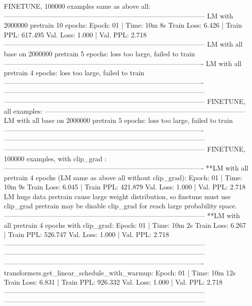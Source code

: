 \documentclass[letterpaper]{article} %
\begin{document}
\begin{CJK*}{UTF8}{gbsn}
FINETUNE, 100000 examples same as above all:
-----------------------------------------------------------------------------------------
LM with 2000000 pretrain 10 epochs:
Epoch: 01 | Time: 10m 8s
	Train Loss: 6.426 | Train PPL: 617.495
	 Val. Loss: 1.000 |  Val. PPL:   2.718
-----------------------------------------------------------------------------------------
LM with all base on 2000000 pretrain 5 epochs:
loss too large, failed to train
----------------------------------------------------------------------------------------
LM with all pretrain 4 epochs:
loss too large, failed to train
----------------------------------------------------------------------------------------
-----------------------------------------------------------------------------------------
-----------------------------------------------------------------------------------------
FINETUNE, all examples:
-----------------------------------------------------------------------------------------
LM with all base on 2000000 pretrain 5 epochs:
loss too large, failed to train
----------------------------------------------------------------------------------------
-----------------------------------------------------------------------------------------
-----------------------------------------------------------------------------------------
FINETUNE, 100000 examples, with clip_grad :
----------------------------------------------------------------------------------------
**LM with all pretrain 4 epochs (LM same as above all without clip_grad):
Epoch: 01 | Time: 10m 9s
	Train Loss: 6.045 | Train PPL: 421.879
	 Val. Loss: 1.000 |  Val. PPL:   2.718
LM huge data pretrain cause large weight distribution, so finetune must use clip_grad
pretrain may be disable clip_grad for reach large probability space.
-----------------------------------------------------------------------------------------
**LM with all pretrain 4 epochs with clip_grad:
Epoch: 01 | Time: 10m 2s
	Train Loss: 6.267 | Train PPL: 526.747
	 Val. Loss: 1.000 |  Val. PPL:   2.718
-----------------------------------------------------------------------------------------
-----------------------------------------------------------------------------------------
----------------------------------------------------------------------------------------
transformers.get_linear_schedule_with_warmup:
Epoch: 01 | Time: 10m 12s
	Train Loss: 6.831 | Train PPL: 926.332
	 Val. Loss: 1.000 |  Val. PPL:   2.718
-----------------------------------------------------------------------------------------
-----------------------------------------------------------------------------------------

\end{CJK*}
\end{document}

